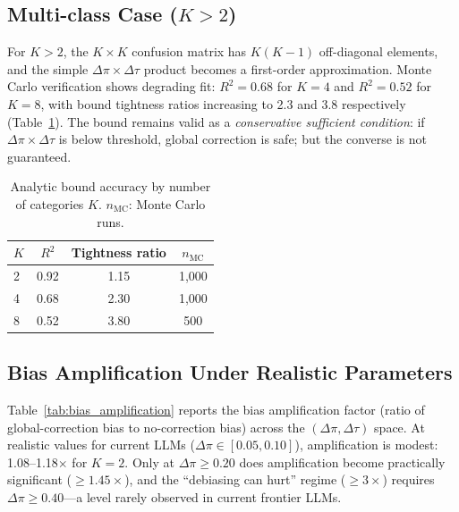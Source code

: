 \documentclass[11pt,a4paper]{article}
\begin{document}
\subsection{Multi-class Case ($K{>}2$)}

For $K > 2$, the $K \times K$ confusion matrix has $K(K{-}1)$ off-diagonal elements, and the simple $\Delta\pi \times \Delta\tau$ product becomes a first-order approximation. Monte Carlo verification shows degrading fit: $R^2 = 0.68$ for $K{=}4$ and $R^2 = 0.52$ for $K{=}8$, with bound tightness ratios increasing to 2.3 and 3.8 respectively (Table~\ref{tab:bound_accuracy}). The bound remains valid as a \emph{conservative sufficient condition}: if $\Delta\pi \times \Delta\tau$ is below threshold, global correction is safe; but the converse is not guaranteed.

\begin{table}[t]
\centering
\caption{Analytic bound accuracy by number of categories $K$. $n_{\text{MC}}$: Monte Carlo runs.}
\label{tab:bound_accuracy}
\begin{tabular}{@{}lccc@{}}
\toprule
$K$ & $R^2$ & Tightness ratio & $n_{\text{MC}}$ \\
\midrule
2 & 0.92 & 1.15 & 1{,}000 \\
4 & 0.68 & 2.30 & 1{,}000 \\
8 & 0.52 & 3.80 & 500 \\
\bottomrule
\end{tabular}
\end{table}

\subsection{Bias Amplification Under Realistic Parameters}

Table~\ref{tab:bias_amplification} reports the bias amplification factor (ratio of global-correction bias to no-correction bias) across the $(\Delta\pi, \Delta\tau)$ space. At realistic values for current LLMs ($\Delta\pi \in [0.05, 0.10]$), amplification is modest: 1.08--1.18$\times$ for $K{=}2$. Only at $\Delta\pi \geq 0.20$ does amplification become practically significant ($\geq 1.45\times$), and the ``debiasing can hurt'' regime ($\geq 3\times$) requires $\Delta\pi \geq 0.40$---a level rarely observed in current frontier LLMs.
\end{document}
